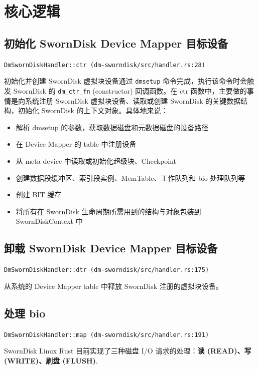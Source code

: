 \clearpage
\section{核心逻辑}

\subsection{初始化 SwornDisk Device Mapper 目标设备}

\texttt{DmSwornDiskHandler::ctr (dm-sworndisk/src/handler.rs:28)}

初始化并创建 SwornDisk 虚拟块设备通过 \texttt{dmsetup} 命令完成，执行该命令时会触发 SwornDisk 的 \texttt{dm_ctr_fn} (constructor) 回调函数。在 ctr 函数中，主要做的事情是向系统注册 SwornDisk 虚拟块设备、读取或创建 SwornDisk 的关键数据结构，初始化 SwornDisk 的上下文对象。具体地来说：

\begin{itemize}[itemsep=2pt,topsep=0pt,parsep=0pt]
  \item 解析 dmsetup 的参数，获取数据磁盘和元数据磁盘的设备路径
  \item 在 Device Mapper 的 table 中注册设备
  \item 从 meta device 中读取或初始化超级块、Checkpoint
  \item 创建数据段缓冲区、索引段实例、MemTable、工作队列和 bio 处理队列等
  \item 创建 BIT 缓存
  \item 将所有在 SwornDisk 生命周期所需用到的结构与对象包装到 SwornDiskContext 中
\end{itemize}

\subsection{卸载 SwornDisk Device Mapper 目标设备}

\texttt{DmSwornDiskHandler::dtr (dm-sworndisk/src/handler.rs:175)}

从系统的 Device Mapper table 中释放 SwornDisk 注册的虚拟块设备。

\subsection{处理 bio}

\texttt{DmSwornDiskHandler::map (dm-sworndisk/src/handler.rs:191)}

SwornDisk Linux Rust 目前实现了三种磁盘 I/O 请求的处理：\textbf{读 (READ)、写 (WRITE)、刷盘 (FLUSH)}. 

